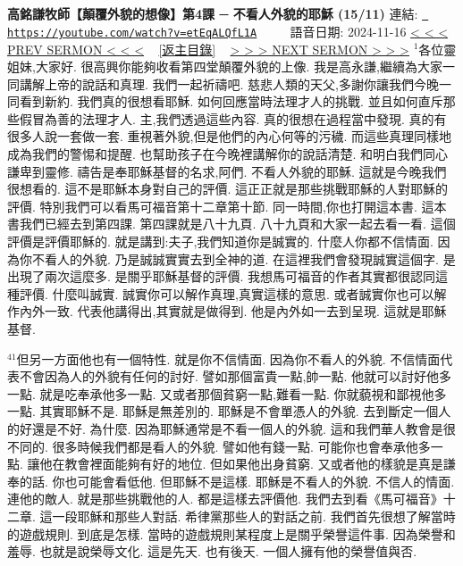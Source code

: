 \documentclass{book}
\begin{document}
\section{}
\label{sec:etEqALQfL1A}
\textbf{高銘謙牧師【顛覆外貌的想像】第4課 ─ 不看人外貌的耶穌 (15/11)}
\newline
\newline
連結: \href{https://youtube.com/watch?v=etEqALQfL1A}{\texttt{ https://youtube.com/watch?v=etEqALQfL1A}} ~~~~ 語音日期: 2024-11-16 
\newline
\newline
\hyperref[sec:Fy3Amm4Hv4o]{\small{< < < PREV SERMON < < <}}
~
\hyperref[sec:index]{\small{[返主目錄]}}
~
\hyperref[sec:code]{\small{> > > NEXT SERMON > > >}}
\newline
\newline
$^{1}$各位靈姐妹,大家好.
很高興你能夠收看第四堂顛覆外貌的上像.
我是高永謙,繼續為大家一同講解上帝的說話和真理.
我們一起祈禱吧.
慈悲人類的天父,多謝你讓我們今晚一同看到新約.
我們真的很想看耶穌.
如何回應當時法理才人的挑戰.
並且如何直斥那些假冒為善的法理才人.
主,我們透過這些內容.
真的很想在過程當中發現.
真的有很多人說一套做一套.
重視著外貌,但是他們的內心何等的污穢.
而這些真理同樣地成為我們的警惕和提醒.
也幫助孩子在今晚裡講解你的說話清楚.
和明白我們同心謙卑到靈修.
禱告是奉耶穌基督的名求,阿們.
不看人外貌的耶穌.
這就是今晚我們很想看的.
這不是耶穌本身對自己的評價.
這正正就是那些挑戰耶穌的人對耶穌的評價.
特別我們可以看馬可福音第十二章第十節.
同一時間,你也打開這本書.
這本書我們已經去到第四課.
第四課就是八十九頁.
八十九頁和大家一起去看一看.
這個評價是評價耶穌的.
就是講到:夫子,我們知道你是誠實的.
什麼人你都不信情面.
因為你不看人的外貌.
乃是誠誠實實去到全神的道.
在這裡我們會發現誠實這個字.
是出現了兩次這麼多.
是關乎耶穌基督的評價.
我想馬可福音的作者其實都很認同這種評價.
什麼叫誠實.
誠實你可以解作真理,真實這樣的意思.
或者誠實你也可以解作內外一致.
代表他講得出,其實就是做得到.
他是內外如一去到呈現.
這就是耶穌基督.

$^{41}$但另一方面他也有一個特性.
就是你不信情面.
因為你不看人的外貌.
不信情面代表不會因為人的外貌有任何的討好.
譬如那個富貴一點,帥一點.
他就可以討好他多一點.
就是吃奉承他多一點.
又或者那個貧窮一點,難看一點.
你就藐視和鄙視他多一點.
其實耶穌不是.
耶穌是無差別的.
耶穌是不會單憑人的外貌.
去到斷定一個人的好還是不好.
為什麼.
因為耶穌通常是不看一個人的外貌.
這和我們華人教會是很不同的.
很多時候我們都是看人的外貌.
譬如他有錢一點.
可能你也會奉承他多一點.
讓他在教會裡面能夠有好的地位.
但如果他出身貧窮.
又或者他的樣貌是真是謙奉的話.
你也可能會看低他.
但耶穌不是這樣.
耶穌是不看人的外貌.
不信人的情面.
連他的敵人.
就是那些挑戰他的人.
都是這樣去評價他.
我們去到看《馬可福音》十二章.
這一段耶穌和那些人對話.
希律黨那些人的對話之前.
我們首先很想了解當時的遊戲規則.
到底是怎樣.
當時的遊戲規則某程度上是關乎榮譽這件事.
因為榮譽和羞辱.
也就是說榮辱文化.
這是先天.
也有後天.
一個人擁有他的榮譽值與否.
\end{document}
